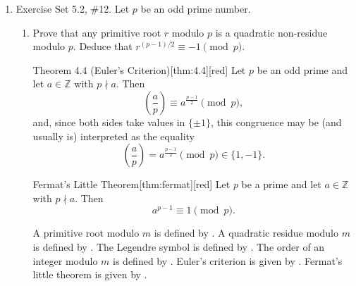 \begin{enumerate}
\begin{subanswer}
    Computing these values:
    \begin{align*}
      2^6 &= 64 \equiv 3 \pmod{61},\\
      2^{18} &= (2^6)^3 \equiv 3^3 = 27 \pmod{61},\\
      2^{42} &= 2^{60-18} \equiv 2^{-18} \equiv (2^{18})^{-1} \equiv 27^{-1} \pmod{61},\\
      2^{54} &= 2^{60-6} \equiv 2^{-6} \equiv (2^6)^{-1} \equiv 3^{-1} \pmod{61}.
    \end{align*}
    To find $27^{-1} \pmod{61}$, the extended Euclidean algorithm is used.
    Since $61 = 27 \cdot 2 + 7$, $27 = 7 \cdot 3 + 6$, and $7 = 6 \cdot 1 + 1$, working backwards:
    \[
    1 = 7 - 6 = 7 - (27 - 7 \cdot 3) = 7 \cdot 4 - 27 = (61 - 27 \cdot 2) \cdot 4 - 27 = 61 \cdot 4 - 27 \cdot 9.
    \]
    Therefore, $27 \cdot (-9) \equiv 1 \pmod{61}$, so $27^{-1} \equiv -9 \equiv 52 \pmod{61}$.
    Hence, $2^{42} \equiv 52 \pmod{61}$.
    
    To find $3^{-1} \pmod{61}$, since $61 = 3 \cdot 20 + 1$, it follows that $1 = 61 - 3 \cdot 20$, so $3 \cdot (-20) \equiv 1 \pmod{61}$.
    Therefore, $3^{-1} \equiv -20 \equiv 41 \pmod{61}$.
    Hence, $2^{54} \equiv 41 \pmod{61}$.
    
    Therefore, all incongruent integers having order $10$ modulo $61$ are $3, 27, 52, 41 \pmod{61}$.
  \end{subanswer}






  \newpage
  \item Exercise Set 5.2, \#12. Let $p$ be an odd prime number.
  \begin{enumerate}
    \item Prove that any primitive root $r$ modulo $p$ is a quadratic non-residue modulo $p$. 
    Deduce that $r^{(p-1)/2} \equiv -1 \pmod{p}$.
    \begin{define}{Theorem 4.4 (Euler's Criterion)}[thm:4.4][red]
      Let $p$ be an odd prime and let $a\in\mathbb{Z}$ with $p\nmid a$. Then
      \[
      \left(\frac{a}{p}\right) \equiv a^{\frac{p-1}{2}} \pmod p,
      \]
      and, since both sides take values in $\{\pm1\}$, this congruence may be (and usually is) interpreted as the equality
      \[
      \left(\frac{a}{p}\right) = a^{\frac{p-1}{2}} \pmod p \in\{1,-1\}.
      \]
    \end{define}
    \begin{define}{Fermat's Little Theorem}[thm:fermat][red]
      Let $p$ be a prime and let $a\in\mathbb{Z}$ with $p\nmid a$. Then
      \[
      a^{p-1}\equiv 1 \pmod{p}.
      \]
    \end{define}
    \begin{subprove}
      A primitive root modulo $m$ is defined by .
      A quadratic residue modulo $m$ is defined by .
      The Legendre symbol is defined by .
      The order of an integer modulo $m$ is defined by .
      Euler's criterion is given by .
      Fermat's little theorem is given by .
      

\end{subprove}
\end{enumerate}
\end{enumerate}
